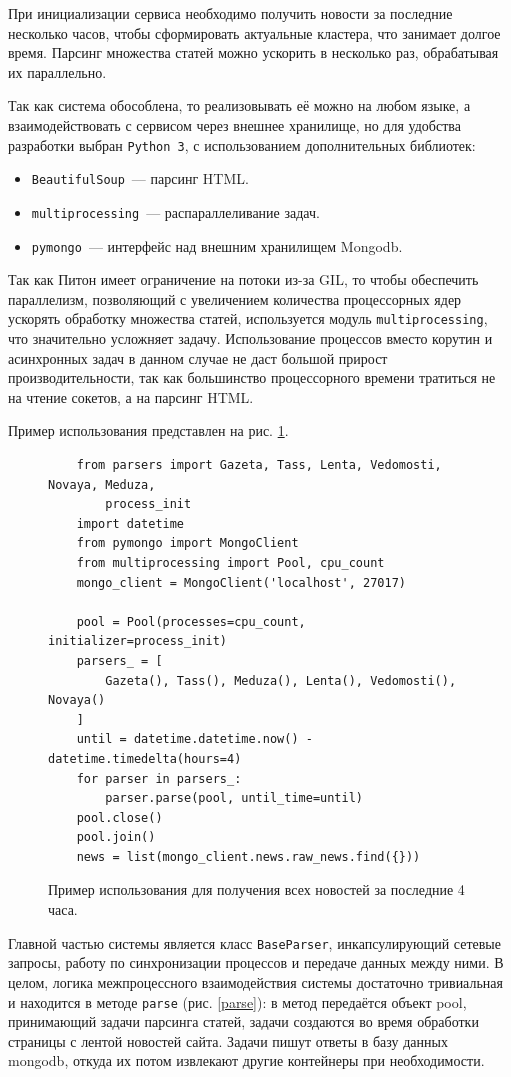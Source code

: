 \documentclass[a4paper, 14pt]{extarticle}
\begin{document}
При инициализации сервиса необходимо получить новости за последние несколько часов, чтобы сформировать актуальные кластера, что занимает долгое время. Парсинг множества статей можно ускорить в несколько раз, обрабатывая их параллельно.

Так как система обособлена, то реализовывать её можно на любом языке, а взаимодействовать с сервисом через внешнее хранилище, но для удобства разработки выбран \texttt{Python 3}, с использованием дополнительных библиотек: 
\begin{itemize}
	\item \texttt{BeautifulSoup}~--- парсинг HTML.
	\item \texttt{multiprocessing}~--- распараллеливание задач.
	\item \texttt{pymongo}~--- интерфейс над внешним хранилищем Mongodb.
\end{itemize}

Так как Питон имеет ограничение на потоки из-за GIL, то чтобы обеспечить параллелизм, позволяющий с увеличением количества процессорных ядер ускорять обработку множества статей, используется модуль \texttt{multiprocessing}, что значительно усложняет задачу. Использование процессов вместо корутин и асинхронных задач в данном случае не даст большой прирост производительности, так как большинство процессорного времени тратиться не на чтение сокетов, а на парсинг HTML. 

Пример использования представлен на рис. \ref{example}. 

\begin{figure}
	\centering
	\begin{verbatim}
	from parsers import Gazeta, Tass, Lenta, Vedomosti, Novaya, Meduza,
	    process_init
	import datetime
	from pymongo import MongoClient
	from multiprocessing import Pool, cpu_count
	mongo_client = MongoClient('localhost', 27017)
	
	pool = Pool(processes=cpu_count, initializer=process_init)
	parsers_ = [
	    Gazeta(), Tass(), Meduza(), Lenta(), Vedomosti(), Novaya()
	]
	until = datetime.datetime.now() - datetime.timedelta(hours=4)
	for parser in parsers_:
	    parser.parse(pool, until_time=until)
	pool.close()
	pool.join()
	news = list(mongo_client.news.raw_news.find({}))
	\end{verbatim}
	\caption{Пример использования для получения всех новостей за последние 4 часа.}
	\label{example}
\end{figure}

Главной частью системы является класс \texttt{BaseParser}, инкапсулирующий сетевые запросы, работу по синхронизации процессов и передаче данных между ними. В целом, логика межпроцессного взаимодействия системы достаточно тривиальная и находится в методе \texttt{parse} (рис. \ref{parse}): в метод передаётся объект pool, принимающий задачи парсинга статей, задачи создаются во время обработки страницы с лентой новостей сайта. Задачи пишут ответы в базу данных mongodb, откуда их потом извлекают другие контейнеры при необходимости. 
\end{document}
